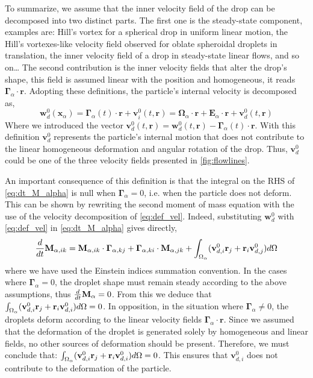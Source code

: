To summarize, we assume that the inner velocity field of the drop can be decomposed into two distinct parts. 
The first one is the steady-state component, examples are: Hill's vortex for a spherical drop in uniform linear motion, the Hill's vortexes-like velocity field observed for oblate spheroidal droplets in translation,  the inner velocity field of a drop in steady-state linear flows, and so on\ldots 
The second contribution is the inner velocity fields that alter the drop's shape, this field is assumed linear with the position and homogeneous, it reads  $\bm\Gamma_\alpha\cdot \textbf{r}$. 
Adopting these definitions, the particle's internal velocity is decomposed as, 
\begin{equation}
    \textbf{w}_{d}^0(\textbf{x}_\alpha)
    = \bm\Gamma_{\alpha}(t) \cdot \textbf{r}
    + \textbf{v}^0_{i}(t,\textbf{r})
    =\bm{\Omega}_{\alpha}\cdot \textbf{r}
    + \textbf{E}_{\alpha} \cdot \textbf{r}
    + \textbf{v}^0_{d}(t,\textbf{r})
    \label{eq:def_vel}
\end{equation}
Where we introduced the vector $\textbf{v}^0_d(t,\textbf{r}) =\textbf{w}^{0}_{d}(t,\textbf{r})  - \bm\Gamma_{\alpha}(t) \cdot \textbf{r}$.
With this definition $\textbf{v}_d^0$ represents the particle's internal motion that does not contribute to the linear homogeneous deformation and angular rotation of the drop. 
Thus, $\textbf{v}_d^0$ could be one of the three velocity fields presented in \ref{fig:flowlines}. 

An important consequence of this definition is that the integral on the RHS of \ref{eq:dt_M_alpha} is null when $\bm\Gamma_\alpha = 0$, i.e. when the particle does not deform. 
This can be shown by rewriting the second moment of mass equation with the use of the velocity decomposition of \ref{eq:def_vel}.
Indeed, substituting $\textbf{w}_d^0$ with \ref{eq:def_vel} in \ref{eq:dt_M_alpha} gives directly,
\begin{equation*}
    \frac{d}{dt} \textbf{M}_{\alpha,ik}
    = 
    \textbf{M}_{\alpha,ik} \cdot \bm\Gamma_{\alpha,kj}
    +  \bm\Gamma_{\alpha,ki} \cdot \textbf{M}_{\alpha,jk}
    +
    \int_{\Omega_{\alpha}}  
        (\textbf{v}_{d,i}^0\textbf{r}_j
        + \textbf{r}_i\textbf{v}_{d,j}^0)
     d\Omega
\end{equation*}
where we have used the Einstein indices summation convention. 
In the cases where $\bm\Gamma_\alpha = 0$, the droplet shape must remain steady according to the above assumptions, thus $\frac{d}{dt} \textbf{M}_\alpha = 0$.
From this we deduce that $\int_{\Omega_{\alpha}} (\textbf{v}^0_{d,i} \textbf{r}_j + \textbf{r}_i \textbf{v}_{d,i}^0) d\Omega = 0$. 
In opposition, in the situation where $\bm\Gamma_\alpha \neq 0$, the droplets deform according to the linear velocity fields $\bm\Gamma_\alpha \cdot \textbf{r}$.
Since we assumed that the deformation of the droplet is generated solely by homogeneous and linear fields, no other sources of deformation should be present. 
Therefore, we must conclude that: $\int_{\Omega_{\alpha}} (\textbf{v}^0_{d,i} \textbf{r}_j + \textbf{r}_i \textbf{v}_{d,i}^0) d\Omega = 0$.
This ensures that $\textbf{v}^0_{d,i} $ does not contribute to the deformation of the particle.


